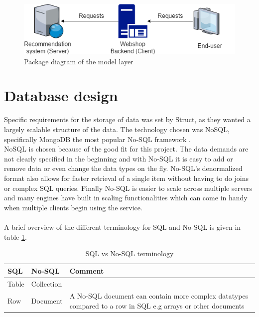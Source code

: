 \begin{figure}
	\centering
	\includegraphics[width=.8\linewidth]{Figures/ClientServer.png}
	\caption{Package diagram of the model layer}
	\label{fig:ClientServer}
\end{figure}

\section{Database design}
Specific requirements for the storage of data was set by Struct, as they wanted a largely scalable structure of the data. The technology chosen was \gls{NoSQL}, specifically \gls{MongoDB} the most popular No-SQL framework \cite{DBRankings}. \\
\gls{NoSQL} is chosen because of the good fit for this project. The data demands are not clearly specified in the beginning and with No-SQL it is easy to add or remove data or even change the data types on the fly. No-SQL's denormalized format also allows for faster retrieval of a single item without having to do joins or complex SQL queries. Finally No-SQL is easier to scale across multiple servers and many engines have built in scaling functionalities \cite{SQLvsNOSQL} which can come in handy when multiple clients begin using the service. \\\\

A brief overview of the different terminology for SQL and No-SQL is given in table \ref{sqlvsnosql_table}.
\begin{table}[H]
	\centering
	\caption{SQL vs No-SQL terminology}
	\label{sqlvsnosql_table}
	\begin{tabular}{|l|l|p{8cm}|}
		\hline
		\textbf{SQL}   & \textbf{No-SQL}     & \textbf{Comment}                                                                                                    \\ \hline
		Table & Collection &                                                                                                            \\ \hline
		Row   & Document   & A No-SQL document can contain more complex datatypes compared to a row in SQL e.g arrays or other documents \\
		\hline
	\end{tabular}
\end{table}

